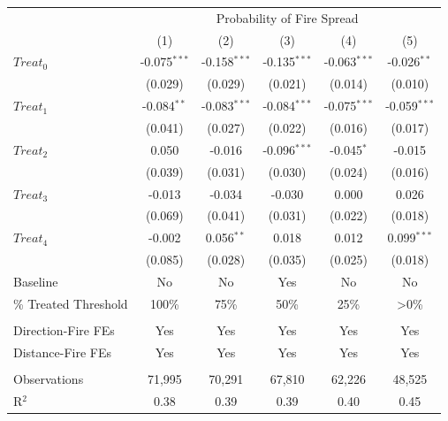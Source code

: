 \begingroup
\centering
\begin{tabular}{lccccc}
   \toprule
    & \multicolumn{5}{c}{Probability of Fire Spread}\\
                         & (1)            & (2)            & (3)            & (4)            & (5)\\  
   \midrule 
   $Treat_0$             & -0.075$^{***}$ & -0.158$^{***}$ & -0.135$^{***}$ & -0.063$^{***}$ & -0.026$^{**}$\\   
                         & (0.029)        & (0.029)        & (0.021)        & (0.014)        & (0.010)\\   
   $Treat_1$             & -0.084$^{**}$  & -0.083$^{***}$ & -0.084$^{***}$ & -0.075$^{***}$ & -0.059$^{***}$\\   
                         & (0.041)        & (0.027)        & (0.022)        & (0.016)        & (0.017)\\   
   $Treat_2$             & 0.050          & -0.016         & -0.096$^{***}$ & -0.045$^{*}$   & -0.015\\   
                         & (0.039)        & (0.031)        & (0.030)        & (0.024)        & (0.016)\\   
   $Treat_3$             & -0.013         & -0.034         & -0.030         & 0.000          & 0.026\\   
                         & (0.069)        & (0.041)        & (0.031)        & (0.022)        & (0.018)\\   
   $Treat_4$             & -0.002         & 0.056$^{**}$   & 0.018          & 0.012          & 0.099$^{***}$\\   
                         & (0.085)        & (0.028)        & (0.035)        & (0.025)        & (0.018)\\   
   Baseline              & No             & No             & Yes            & No             & No\\  
   \% Treated Threshold  & 100\%          & 75\%           & 50\%           & 25\%           & >0\%\\   
    \\
   Direction-Fire FEs    & Yes            & Yes            & Yes            & Yes            & Yes\\  
   Distance-Fire FEs     & Yes            & Yes            & Yes            & Yes            & Yes\\  
    \\
   Observations          & 71,995         & 70,291         & 67,810         & 62,226         & 48,525\\  
   R$^2$                 & 0.38           & 0.39           & 0.39           & 0.40           & 0.45\\  
   \bottomrule
\end{tabular}
\par\endgroup
